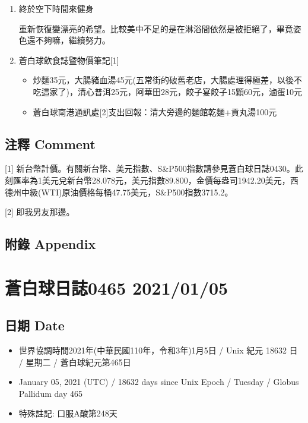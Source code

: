 \documentclass[a5paper, 11pt
]{book}
\providecommand{\tightlist}{%
  \setlength{\itemsep}{0pt}\setlength{\parskip}{0pt}}
\begin{document}
\begin{enumerate}
\def\labelenumi{\arabic{enumi}.}
\item
  終於空下時間來健身

  重新恢復變漂亮的希望。比較美中不足的是在淋浴間依然是被拒絕了，畢竟姿色還不夠嘛，繼續努力。
\item
  蒼白球飲食誌暨物價筆記{[}1{]}

  \begin{itemize}
  \tightlist
  \item
    炒麵35元，大腸豬血湯45元(五常街的破舊老店，大腸處理得極差，以後不吃這家了)，清心普洱25元，阿華田28元，餃子宴餃子15顆60元，滷蛋10元
  \item
    蒼白球南港通訊處{[}2{]}支出回報：清大旁邊的麵館乾麵+貢丸湯100元
  \end{itemize}
\end{enumerate}

\hypertarget{ux6ce8ux91cb-comment-34}{%
\subsection{注釋 Comment}\label{ux6ce8ux91cb-comment-34}}

{[}1{]}
新台幣計價。有關新台幣、美元指數、S\&P500指數請參見蒼白球日誌0430。此刻匯率為1美元兌新台幣28.078元，美元指數89.800，金價每盎司1942.20美元，西德州中級(WTI)原油價格每桶47.75美元，S\&P500指數3715.2。

{[}2{]} 即我男友那邊。

\hypertarget{ux9644ux9304-appendix-34}{%
\subsection{附錄 Appendix}\label{ux9644ux9304-appendix-34}}

\hypertarget{ux84bcux767dux7403ux65e5ux8a8c0465-20210105}{%
\section{蒼白球日誌0465
2021/01/05}\label{ux84bcux767dux7403ux65e5ux8a8c0465-20210105}}

\hypertarget{ux65e5ux671f-date-35}{%
\subsection{日期 Date}\label{ux65e5ux671f-date-35}}

\begin{itemize}
\tightlist
\item
  世界協調時間2021年(中華民國110年，令和3年)1月5日 / Unix 紀元 18632 日
  / 星期二 / 蒼白球紀元第465日
\item
  January 05, 2021 (UTC) / 18632 days since Unix Epoch / Tuesday /
  Globus Pallidum day 465
\item
  特殊註記: 口服A酸第248天
\end{itemize}
\end{document}
